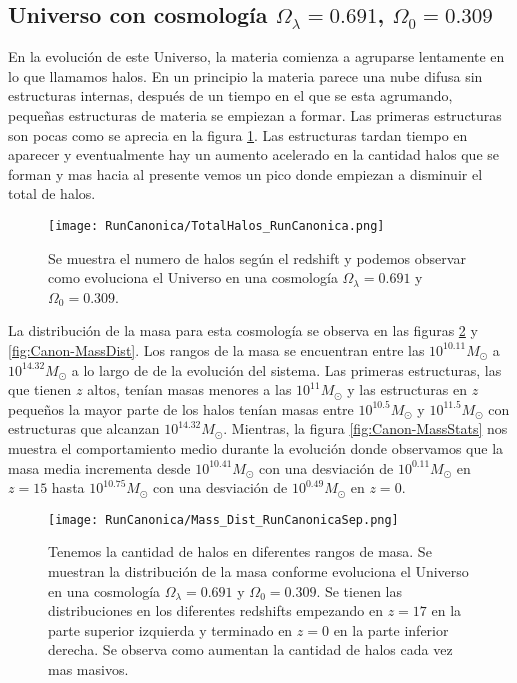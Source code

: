 \subsection{Universo con cosmología  \texorpdfstring{$\Omega_\lambda = 0.691$, $\Omega_0 = 0.309$ }{Omega lambda = 0.691, Omega 0 = 0.309}  }

 En la evolución de este Universo, la materia comienza a agruparse lentamente en lo que llamamos halos. En un principio la materia parece una nube difusa sin estructuras internas, después de un tiempo en el que se esta agrumando, pequeñas estructuras de materia se empiezan a formar. Las primeras estructuras son pocas como se aprecia en la figura \ref{fig:Canon_TotalHalos}. Las estructuras tardan tiempo en aparecer y eventualmente hay un aumento acelerado en la cantidad halos que se forman y mas hacia al presente vemos un pico donde empiezan a disminuir el total de halos.

\begin{figure}[H]
    \centering
    \texttt{[image: RunCanonica/TotalHalos\_RunCanonica.png]}
    \caption[Evolución del número de halos en un Universo $\Omega_\lambda = 0.691 $, $\Omega_0 = 0.309$]{\footnotesize Se muestra el numero de halos según el redshift y podemos observar como evoluciona el Universo en una cosmología $\Omega_\lambda = 0.691 $ y $\Omega_0 = 0.309$.}
    \label{fig:Canon_TotalHalos}
\end{figure}

La distribución de la masa para esta cosmología se observa en las figuras \ref{fig:Canon-MassDistSep} y \ref{fig:Canon-MassDist}. Los rangos de la masa se encuentran entre las $10^{10.11}M_\odot$ a $10^{14.32}M_\odot$ a lo largo de de la evolución del sistema. Las primeras estructuras, las que tienen $z$ altos, tenían masas menores a las $10^{11}M_\odot$ y las estructuras en $z$ pequeños la mayor parte de los halos tenían masas entre $10^{10.5}M_\odot$ y $10^{11.5}M_\odot$ con estructuras que alcanzan $10^{14.32}M_\odot$. Mientras, la figura \ref{fig:Canon-MassStats} nos muestra el comportamiento medio durante la evolución donde observamos que la masa media incrementa desde $10^{10.41}M_\odot$ con una desviación de $10^{0.11}M_\odot$ en $z=15$ hasta $10^{10.75}M_\odot$ con una desviación de $10^{0.49}M_\odot$ en $z=0$.

\begin{figure}[H]
    \centering
    \texttt{[image: RunCanonica/Mass\_Dist\_RunCanonicaSep.png]}
    \caption[Distribución de masa]{\footnotesize Tenemos la cantidad de halos en diferentes rangos de masa. Se muestran la distribución de la masa conforme evoluciona el Universo en una cosmología $\Omega_\lambda = 0.691 $ y $\Omega_0 = 0.309$. Se tienen las distribuciones en los diferentes redshifts empezando en $z=17$ en la parte superior izquierda y terminado en $z=0$ en la parte inferior derecha. Se observa como aumentan la cantidad de halos cada vez mas masivos.}
    \label{fig:Canon-MassDistSep}
\end{figure}

